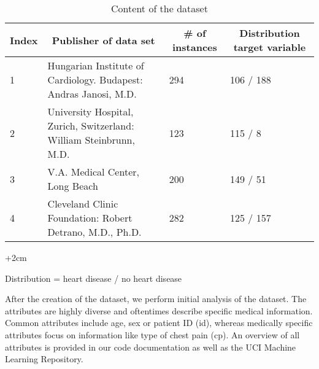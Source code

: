 \begin{table}[]
\begin{adjustwidth}{-2cm}{}
\begin{footnotesize}
\begin{tabular}{|l|l|l|l|}
\hline
\textbf{Index} & \multicolumn{1}{c|}{\textbf{Publisher of data set}}                & \multicolumn{1}{c|}{\textbf{\# of instances}} & \multicolumn{1}{c|}{\textbf{Distribution target variable}} \\ \hline
1              & Hungarian Institute of Cardiology. Budapest: Andras Janosi, M.D.   & 294                                           & 106 / 188                                                                                          \\ \hline
2              & University Hospital, Zurich, Switzerland: William Steinbrunn, M.D. & 123                                           & 115 / 8                                                                                            \\ \hline
3              & V.A. Medical Center, Long Beach                                    & 200                                           & 149 / 51                                                                                           \\ \hline
4              & Cleveland Clinic Foundation: Robert Detrano, M.D., Ph.D.           & 282                                           & 125 / 157                                                                                          \\ \hline
\end{tabular}
\begin{adjustwidth}{+2cm}{}
\begin{center}
\centering
Distribution = heart disease / no heart disease
\end{center}
\end{adjustwidth}

\caption{Content of the dataset} 
\label{table:datasets}
\end{footnotesize}
\end{adjustwidth}
\end{table}

After the creation of the dataset, we perform initial analysis of the dataset. The attributes are highly diverse and oftentimes describe specific medical information. Common attributes include age, sex or patient ID (id), whereas medically specific attributes focus on information like type of chest pain (cp). An overview of all attributes is provided in our code documentation as well as the UCI Machine Learning Repository. 

